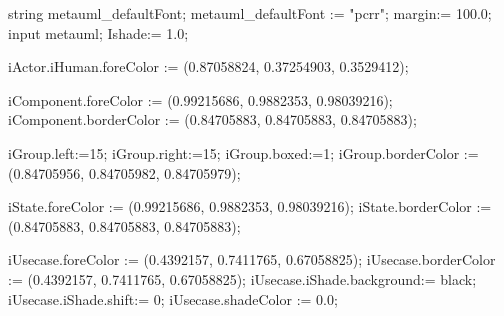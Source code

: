 
string metauml_defaultFont;
metauml_defaultFont  := "pcrr";
margin:= 100.0;
input metauml;
Ishade:= 1.0;

iActor.iHuman.foreColor := (0.87058824, 0.37254903, 0.3529412);

iComponent.foreColor := (0.99215686, 0.9882353, 0.98039216);
iComponent.borderColor := (0.84705883, 0.84705883, 0.84705883);

iGroup.left:=15;
iGroup.right:=15;
iGroup.boxed:=1;
iGroup.borderColor := (0.84705956, 0.84705982, 0.84705979);



iState.foreColor := (0.99215686, 0.9882353, 0.98039216);
iState.borderColor := (0.84705883, 0.84705883, 0.84705883);

iUsecase.foreColor := (0.4392157, 0.7411765, 0.67058825);
iUsecase.borderColor := (0.4392157, 0.7411765, 0.67058825);
iUsecase.iShade.background:= black;
iUsecase.iShade.shift:= 0;
iUsecase.shadeColor := 0.0;

